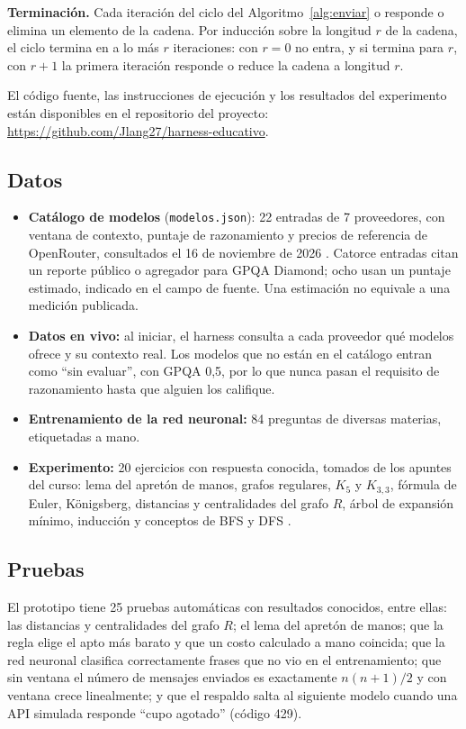 \documentclass[12pt,letterpaper]{article}
\begin{document}
\textbf{Terminación.} Cada iteración del ciclo del Algoritmo~\ref{alg:enviar} o responde o elimina un elemento de la cadena. Por inducción sobre la longitud $r$ de la cadena, el ciclo termina en a lo más $r$ iteraciones: con $r=0$ no entra, y si termina para $r$, con $r+1$ la primera iteración responde o reduce la cadena a longitud $r$.

El código fuente, las instrucciones de ejecución y los resultados del experimento están disponibles en el repositorio del proyecto: \url{https://github.com/Jlang27/harness-educativo}.

\subsection{Datos}
\begin{itemize}[nosep]
  \item \textbf{Catálogo de modelos} (\texttt{modelos.json}): 22 entradas de 7 proveedores, con ventana de contexto, puntaje de razonamiento y precios de referencia de OpenRouter, consultados el 16 de noviembre de 2026 \parencite{openrouter2026}. Catorce entradas citan un reporte público o agregador para GPQA Diamond; ocho usan un puntaje estimado, indicado en el campo de fuente. Una estimación no equivale a una medición publicada.
  \item \textbf{Datos en vivo:} al iniciar, el harness consulta a cada proveedor qué modelos ofrece y su contexto real. Los modelos que no están en el catálogo entran como \enquote{sin evaluar}, con GPQA 0,5, por lo que nunca pasan el requisito de razonamiento hasta que alguien los califique.
  \item \textbf{Entrenamiento de la red neuronal:} 84 preguntas de diversas materias, etiquetadas a mano.
  \item \textbf{Experimento:} 20 ejercicios con respuesta conocida, tomados de los apuntes del curso: lema del apretón de manos, grafos regulares, $K_5$ y $K_{3,3}$, fórmula de Euler, Königsberg, distancias y centralidades del grafo $R$, árbol de expansión mínimo, inducción y conceptos de BFS y DFS \parencite{gomez2026grafos,gomez2026redes,zuleta2026discretas}.
\end{itemize}

\subsection{Pruebas}
El prototipo tiene 25 pruebas automáticas con resultados conocidos, entre ellas: las distancias y centralidades del grafo $R$; el lema del apretón de manos; que la regla elige el apto más barato y que un costo calculado a mano coincida; que la red neuronal clasifica correctamente frases que no vio en el entrenamiento; que sin ventana el número de mensajes enviados es exactamente $n(n+1)/2$ y con ventana crece linealmente; y que el respaldo salta al siguiente modelo cuando una API simulada responde \enquote{cupo agotado} (código 429).
\end{document}
